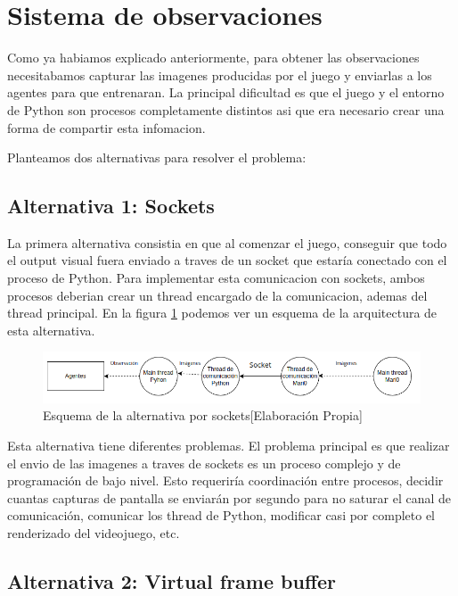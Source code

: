 \section{Sistema de observaciones}

Como ya habiamos explicado anteriormente, para obtener las observaciones necesitabamos capturar las imagenes producidas por el juego y enviarlas a los agentes para que entrenaran. La principal dificultad es que el juego y el entorno de Python son procesos completamente distintos asi que era necesario crear una forma de compartir esta infomacion.

Planteamos dos alternativas para resolver el problema:

\subsection*{Alternativa 1: Sockets}

La primera alternativa consistia en que al comenzar el juego, conseguir que todo el output visual fuera enviado a traves de un socket que estaría conectado con el proceso de Python. Para implementar esta comunicacion con sockets, ambos procesos deberian crear un thread encargado de la comunicacion, ademas del thread principal. En la figura \ref {fig:alternativa-1-com} podemos ver un esquema de la arquitectura de esta alternativa.

\begin{figure}[ht]
    \centering
    \includegraphics[width=1.0\textwidth]{img/Observations-1.png}
    \caption{Esquema de la alternativa por sockets[Elaboración Propia]}
    \label{fig:alternativa-1-com}
\end{figure}

Esta alternativa tiene diferentes problemas. El problema principal es que realizar el envio de las imagenes a traves de sockets es un proceso complejo y de programación de bajo nivel. Esto requeriría coordinación entre procesos, decidir cuantas capturas de pantalla se enviarán por segundo para no saturar el canal de comunicación, comunicar los thread de Python, modificar casi por completo el renderizado del videojuego, etc.

\subsection*{Alternativa 2: Virtual frame buffer}

